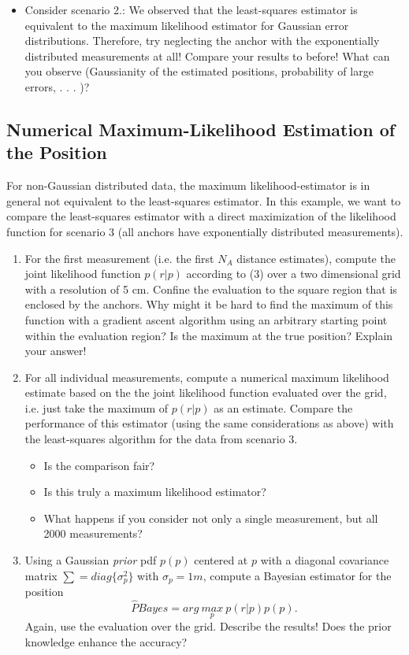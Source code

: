 \documentclass[a4paper]{article}
\begin{document}
\begin{itemize}
\begin{itemize}
\end{itemize}

\item Consider scenario 2.: We observed that the least-squares estimator is equivalent to the maximum likelihood estimator for Gaussian error distributions. Therefore, try neglecting the anchor with the exponentially distributed measurements at all! Compare your results to before! What can you observe (Gaussianity of the estimated positions, probability of large errors, . . . )? \\

\end{itemize}

\newpage

\subsection{Numerical Maximum-Likelihood Estimation of the Position}
For non-Gaussian distributed data, the maximum likelihood-estimator is in general not equivalent to the least-squares estimator. In this example, we want to compare the least-squares estimator with a direct maximization of the likelihood function for scenario 3 (all anchors have exponentially distributed measurements).

\begin{enumerate}
\item  For the first measurement (i.e. the first $N_A$ distance estimates), compute the joint likelihood function $p(r|p)$ according to (3) over a two dimensional grid with a resolution of 5 cm. Confine the evaluation to the square region that is enclosed by the anchors. Why might it be hard to find the maximum of this function with a gradient ascent algorithm using an arbitrary starting point within the evaluation region?\newline
Is the maximum at the true position? Explain your answer!
\item For all individual measurements, compute a numerical maximum likelihood estimate based on the the joint likelihood function evaluated over the grid, i.e. just take the maximum of $p(r|p)$ as an estimate. Compare the performance of this estimator (using the same considerations as above) with the least-squares algorithm for the data from scenario 3.

\begin{itemize}
\item Is the comparison fair?
\item Is this truly a maximum likelihood estimator?
\item What happens if you consider not only a single measurement, but all 2000 measurements?
\end{itemize}

\item  Using a Gaussian \textit{prior} pdf $p(p)$ centered at $p$ with a diagonal covariance matrix $\sum = diag \{ \sigma^2_p \}$ with $\sigma_p = 1m$, compute a Bayesian estimator for the position
\[
\hat{P}Bayes = arg ~\underset{p}{max} ~p(r|p)p(p).
\]
Again, use the evaluation over the grid. Describe the results! Does the prior knowledge enhance the accuracy?
\end{enumerate}
\end{document}
